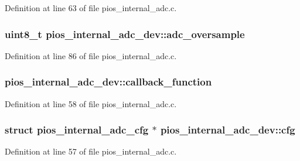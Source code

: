 \-Definition at line 63 of file pios\-\_\-internal\-\_\-adc.\-c.

\hypertarget{structpios__internal__adc__dev_ad4336deb16f57be5b04bb29f1d097919}{
\subsubsection[{adc\-\_\-oversample}]{\setlength{\rightskip}{0pt plus 5cm}uint8\-\_\-t {\bf pios\-\_\-internal\-\_\-adc\-\_\-dev\-::adc\-\_\-oversample}}}\label{structpios__internal__adc__dev_ad4336deb16f57be5b04bb29f1d097919}


\-Definition at line 86 of file pios\-\_\-internal\-\_\-adc.\-c.

\hypertarget{structpios__internal__adc__dev_a37d5ceea71528408b138c75766cdc4ef}{
\subsubsection[{callback\-\_\-function}]{ {\bf pios\-\_\-internal\-\_\-adc\-\_\-dev\-::callback\-\_\-function}}}\label{structpios__internal__adc__dev_a37d5ceea71528408b138c75766cdc4ef}


\-Definition at line 58 of file pios\-\_\-internal\-\_\-adc.\-c.

\hypertarget{structpios__internal__adc__dev_af097c853721ad19203129bbc1b20726a}{
\subsubsection[{cfg}]{\setlength{\rightskip}{0pt plus 5cm}struct {\bf pios\-\_\-internal\-\_\-adc\-\_\-cfg} $\ast$ {\bf pios\-\_\-internal\-\_\-adc\-\_\-dev\-::cfg}}}\label{structpios__internal__adc__dev_af097c853721ad19203129bbc1b20726a}


\-Definition at line 57 of file pios\-\_\-internal\-\_\-adc.\-c.

